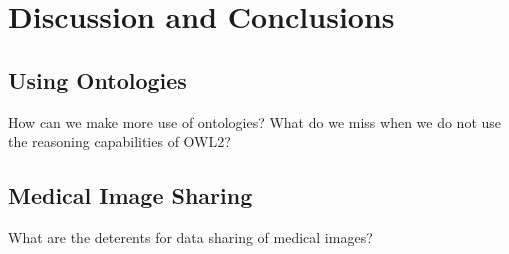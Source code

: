 
\chapter{Discussion and Conclusions} %

\label{Chapter6} %



\section{Using Ontologies}

How can we make more use of ontologies? What do we
miss when we do not use the reasoning capabilities of
OWL2?


\section{Medical Image Sharing}

What are the deterents for data sharing of
medical images?
